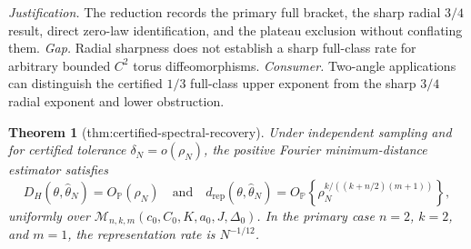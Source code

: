 \documentclass{article}
\newtheorem{theorem}{Theorem}
\begin{document}
\par\smallskip\noindent \textit{Justification.} The reduction records the primary full bracket, the sharp radial \(3/4\) result, direct zero-law identification, and the plateau exclusion without conflating them. \textit{Gap.} Radial sharpness does not establish a sharp full-class rate for arbitrary bounded \(C^2\) torus diffeomorphisms. \textit{Consumer.} Two-angle applications can distinguish the certified \(1/3\) full-class upper exponent from the sharp \(3/4\) radial exponent and lower obstruction.

\begin{theorem}[thm:certified-spectral-recovery]\label{thm:certified-spectral-recovery}
Under independent sampling and for certified tolerance \(\delta_N=o(\rho_N)\), the positive Fourier minimum-distance estimator satisfies
\[
D_H(\theta,\widehat\theta_N)=O_{\mathbb P}(\rho_N)
\quad\text{and}\quad
d_{\mathrm{rep}}(\theta,\widehat\theta_N)
=O_{\mathbb P}\!\left\{\rho_N^{k/((k+n/2)(m+1))}\right\},
\]
uniformly over \(\mathcal M_{n,k,m}(c_0,C_0,K,a_0,J,\Delta_0)\). In the primary case \(n=2\), \(k=2\), and \(m=1\), the representation rate is \(N^{-1/12}\).
\end{theorem}
\end{document}

